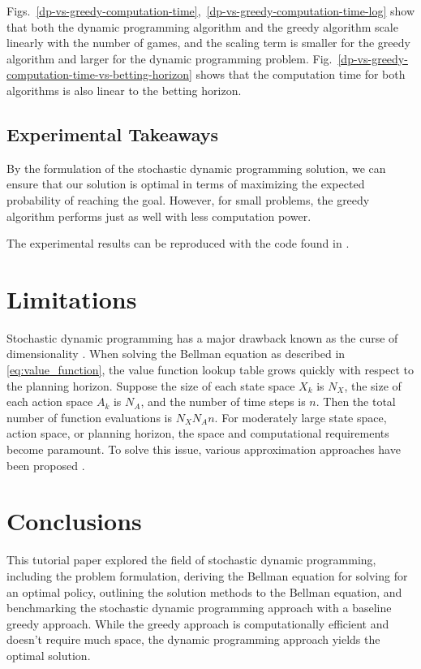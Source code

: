\documentclass[conference]{IEEEtran}
\begin{document}
Figs.~\ref{dp-vs-greedy-computation-time},~\ref{dp-vs-greedy-computation-time-log} show that both the dynamic programming algorithm and the greedy algorithm scale linearly with the number of games, and the scaling term is smaller for the greedy algorithm and larger for the dynamic programming problem. Fig.~\ref{dp-vs-greedy-computation-time-vs-betting-horizon} shows that the computation time for both algorithms is also linear to the betting horizon.

\subsection{Experimental Takeaways}

By the formulation of the stochastic dynamic programming solution, we can ensure that our solution is optimal in terms of maximizing the expected probability of reaching the goal. However, for small problems, the greedy algorithm performs just as well with less computation power.

The experimental results can be reproduced with the code found in \cite{zhang2021}.

\section{Limitations}

Stochastic dynamic programming has a major drawback known as the curse of dimensionality \cite{Rogers2010coursenotes}. When solving the Bellman equation as described in \eqref{eq:value_function}, the value function lookup table grows quickly with respect to the planning horizon. Suppose the size of each state space $X_k$ is $N_X$, the size of each action space $A_k$ is $N_A$, and the number of time steps is $n$. Then the total number of function evaluations is $N_XN_An$. For moderately large state space, action space, or planning horizon, the space and computational requirements become paramount. To solve this issue, various approximation approaches have been proposed \cite{powell2007approximate}.

\section{Conclusions}

This tutorial paper explored the field of stochastic dynamic programming, including the problem formulation, deriving the Bellman equation for solving for an optimal policy, outlining the solution methods to the Bellman equation, and benchmarking the stochastic dynamic programming approach with a baseline greedy approach. While the greedy approach is computationally efficient and doesn't require much space, the dynamic programming approach yields the optimal solution.
\end{document}
